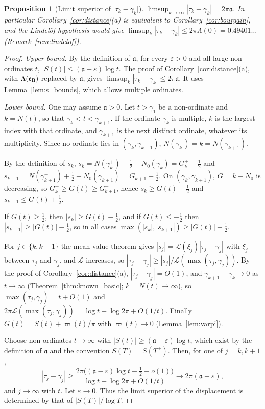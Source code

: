 \documentclass[11pt,a4paper]{article}
\makeatletter
\numberwithin{equation}{section}
\DeclareRobustCommand{\CGref}[1]{\ref{#1}}
\let\CG@origref\ref
\newcommand{\CG@gettip}[1]{\@ifundefined{CGTip@#1}{#1}{\csname CGTip@#1\endcsname}}
\DeclareRobustCommand{\CGref}[1]{\pdftooltip{\CG@origref{#1}}{\CG@gettip{#1}}}
\newtheorem{proposition}[theorem]{Proposition}
\theoremstyle{definition}
\theoremstyle{remark}
\newcommand{\Nz}{N_0} %
\newcommand{\lL}{\mathcal L}
\newcommand{\eB}{\mathfrak e_{\rm B}}
\makeatother
\begin{document}
\begin{proposition}[Limit superior of $\lvert\tau_k-\gamma_k\rvert$]\label{prop:distance_sharp}
$\limsup_{k\to\infty}|\tau_k-\gamma_k|=2\pi\mathfrak a$. In particular Corollary~\CGref{cor:distance}(a) is equivalent to Corollary~\CGref{cor:bourgain}, and the Lindel\"of hypothesis would give $\limsup_k|\tau_k-\gamma_k|\le2\pi\Lambda(0)=0.49401\ldots$ (Remark~\CGref{rem:lindelof}).
\end{proposition}

\begin{proof}
\emph{Upper bound.} By the definition of $\mathfrak a$, for every $\varepsilon>0$ and all large non-ordinates $t$, $|S(t)|\le(\mathfrak a+\varepsilon)\log t$. The proof of Corollary~\CGref{cor:distance}(a), with $\Lambda(\eB)$ replaced by $\mathfrak a$, gives $\limsup_k|\tau_k-\gamma_k|\le2\pi\mathfrak a$. It uses Lemma~\CGref{lem:s_bounds}, which allows multiple ordinates.

\emph{Lower bound.} One may assume $\mathfrak a>0$. Let $t>\gamma_1$ be a non-ordinate and $k=N(t)$, so that $\gamma_k<t<\gamma_{k+1}$. If the ordinate $\gamma_k$ is multiple, $k$ is the largest index with that ordinate, and $\gamma_{k+1}$ is the next distinct ordinate, whatever its multiplicity. Since no ordinate lies in $(\gamma_k,\gamma_{k+1})$, $N(\gamma_k^+)=k=N(\gamma_{k+1}^-)$.

By the definition of $s_k$, $s_k=N(\gamma_k^+)-\frac12-\Nz(\gamma_k)=G_k^+-\frac12$ and $s_{k+1}=N(\gamma_{k+1}^-)+\frac12-\Nz(\gamma_{k+1})=G_{k+1}^-+\frac12$. On $(\gamma_k,\gamma_{k+1})$, $G=k-\Nz$ is decreasing, so $G_k^+\ge G(t)\ge G_{k+1}^-$, hence $s_k\ge G(t)-\frac12$ and $s_{k+1}\le G(t)+\frac12$.

If $G(t)\ge\frac12$, then $|s_k|\ge G(t)-\frac12$, and if $G(t)\le-\frac12$ then $|s_{k+1}|\ge|G(t)|-\frac12$, so in all cases $\max(|s_k|,|s_{k+1}|)\ge|G(t)|-\frac12$.

For $j\in\{k,k+1\}$ the mean value theorem gives $|s_j|=\lL(\xi_j)|\tau_j-\gamma_j|$ with $\xi_j$ between $\tau_j$ and $\gamma_j$, and $\lL$ increases, so $|\tau_j-\gamma_j|\ge|s_j|/\lL(\max(\tau_j,\gamma_j))$. By the proof of Corollary~\CGref{cor:distance}(a), $|\tau_j-\gamma_j|=O(1)$, and $\gamma_{k+1}-\gamma_k\to0$ as $t\to\infty$ (Theorem~\CGref{thm:known_basic}; $k=N(t)\to\infty$), so $\max(\tau_j,\gamma_j)=t+O(1)$ and $2\pi\lL(\max(\tau_j,\gamma_j))=\log t-\log2\pi+O(1/t)$. Finally $G(t)=S(t)+\varpi(t)/\pi$ with $\varpi(t)\to0$ (Lemma~\CGref{lem:varpi}).

Choose non-ordinates $t\to\infty$ with $|S(t)|\ge(\mathfrak a-\varepsilon)\log t$, which exist by the definition of $\mathfrak a$ and the convention $S(T)=S(T^+)$. Then, for one of $j=k,k+1$,
\begin{equation}
|\tau_j-\gamma_j|\ge\frac{2\pi\bigl((\mathfrak a-\varepsilon)\log t-\frac12-o(1)\bigr)}{\log t-\log2\pi+O(1/t)}\longrightarrow2\pi(\mathfrak a-\varepsilon),
\label{eq:disp_19}
\end{equation}
and $j\to\infty$ with $t$. Let $\varepsilon\to0$. Thus the limit superior of the displacement is determined by that of $|S(T)|/\log T$.
\end{proof}
\end{document}
